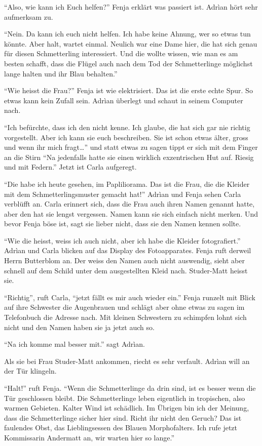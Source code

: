 \enquote{Also, wie kann ich Euch helfen?} Fenja erklärt was passiert ist. Adrìan hört sehr aufmerksam zu.

\enquote{Nein. Da kann ich euch nicht helfen. Ich habe keine Ahnung, wer so etwas tun könnte. Aber halt, wartet einmal. Neulich war eine Dame hier, die hat sich genau für diesen Schmetterling interessiert. Und die wollte wissen, wie man es am besten schafft, dass die Flügel auch nach dem Tod der Schmetterlinge möglichst lange halten und ihr Blau behalten.}

\enquote{Wie heisst die Frau?} Fenja ist wie elektrisiert. Das ist die erste echte Spur. So etwas kann kein Zufall sein. Adrìan überlegt und schaut in seinem Computer nach.

\enquote{Ich befürchte, dass ich den nicht kenne. Ich glaube, die hat sich gar nie richtig vorgestellt. Aber ich kann sie euch beschreiben. Sie ist schon etwas älter, gross und wenn ihr mich fragt\dots} und statt etwas zu sagen tippt er sich mit dem Finger an die Stirn \enquote{Na jedenfalls hatte sie einen wirklich exzentrischen Hut auf. Riesig und mit Federn.} Jetzt ist Carla aufgeregt. 

\enquote{Die habe ich heute gesehen, im Papliliorama. Das ist die Frau, die die Kleider mit dem Schmetterlingsmuster gemacht hat!} Adrìan und Fenja sehen Carla verblüfft an. Carla erinnert sich, dass die Frau auch ihren Namen genannt hatte, aber den hat sie lengst vergessen. Namen kann sie sich einfach nicht merken. Und bevor Fenja böse ist, sagt sie lieber nicht, dass sie den Namen kennen sollte.

\enquote{Wie die heisst, weiss ich auch nicht, aber ich habe die Kleider fotografiert.} Adrìan und Carla blicken auf das Display des Fotoapparates. Fenja ruft derweil Herrn Butterblom an. Der weiss den Namen auch nicht auswendig, sieht aber schnell auf dem Schild unter dem ausgestellten Kleid nach. Studer-Matt heisst sie.

\enquote{Richtig}, ruft Carla, \enquote{jetzt fällt es mir auch wieder ein.} Fenja runzelt mit Blick auf ihre Schwester die Augenbrauen und schlägt aber ohne etwas zu sagen im Telefonbuch die Adresse nach. Mit kleinen Schwestern zu schimpfen lohnt sich nicht und den Namen haben sie ja jetzt auch so.

\enquote{Na ich komme mal besser mit.} sagt Adrìan.

Als sie bei Frau Studer-Matt ankommen, riecht es sehr verfault. Adrìan will an der Tür klingeln.

\enquote{Halt!} ruft Fenja. \enquote{Wenn die Schmetterlinge da drin sind, ist es besser wenn die Tür geschlossen bleibt. Die Schmetterlinge leben eigentlich in tropischen, also warmen Gebieten. Kalter Wind ist schädlich. Im Übrigen bin ich der Meinung, dass die Schmetterlinge sicher hier sind. Richt ihr nicht den Geruch? Das ist faulendes Obst, das Lieblingsessen des Blauen Morphofalters. Ich rufe jetzt Kommissarin Andermatt an, wir warten hier so lange.}

